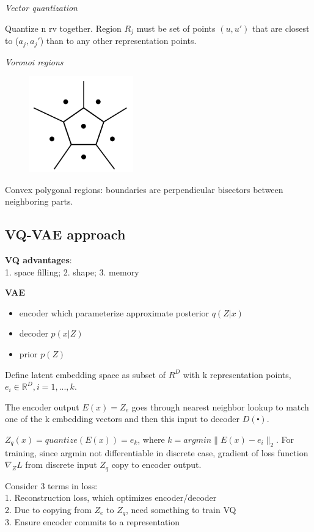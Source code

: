 \documentclass[12pt,a4paper]{article}
\begin{document}
\vspace{0.5cm}
\textit{Vector quantization}

Quantize n rv together. Region $R_j$ must be set of points $(u, u')$ that are closest to ($a_j, a_j'$) than to any other representation points.

\textit{Voronoi regions}
\begin{figure}[!ht]
    \centering
    \includegraphics[width=0.4\textwidth]{fig/convex_poly_region.png}
\end{figure}

Convex polygonal regions: boundaries are perpendicular bisectors between neighboring parts. 

\subsection{VQ-VAE approach}
\textbf{VQ advantages}:\\
1. space filling; 2. shape; 3. memory

\textbf{VAE}
\begin{itemize}
    \item encoder which parameterize approximate posterior $q(Z|x)$
    \item decoder $p(x|Z)$
    \item prior $p(Z)$
\end{itemize}
   
Define latent embedding space as subset of $R^D$ with k representation points, $e_i\in \mathbb{R}^D, i=1,...,k$.

The encoder output $E(x)=Z_e$ goes through nearest neighbor lookup to match one of the k embedding vectors and then this input to decoder $D(\centerdot)$.

$Z_q(x)=quantize(E(x))=e_k$, where $k=argmin\|E(x)-e_i\|_2$. For training, since argmin not differentiable in discrete case, gradient of loss function $\nabla_Z L$ from discrete input $Z_q$ copy to encoder output. 

Consider 3 terms in loss: \\
1. Reconstruction loss, which optimizes encoder/decoder\\
2. Due to copying from $Z_e$ to $Z_q$, need something to train VQ \\
3. Ensure encoder commits to a representation
\end{document}
